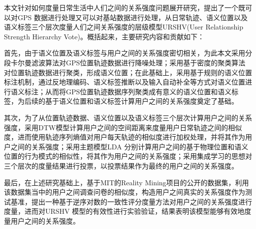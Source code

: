 \begin{cabstract}
本文针对如何度量日常生活中人们之间的关系强度问题展开研究，提出了一个既可以对GPS 数据进行处理又可以对基站数据进行处理，从日常轨迹、语义位置以及语义标签三个层次度量人们之间关系强度的层级模型URSHV(User Relationship Strength Hierarchy Vote)。概括起来，主要研究内容和贡献如下：
\par 首先，由于语义位置及语义标签与用户之间的关系强度密切相关，为此本文采用分段卡尔曼滤波算法对GPS位置轨迹数据进行降噪处理；采用基于密度的聚类算法对位置轨迹数据进行聚类，形成语义位置；在此基础上，采用基于规则的语义位置标注机制，通过反地理编码、语义标签推断以及输入自动补全等方式对语义位置进行语义标注；从而将GPS位置轨迹数据序列聚类成有意义的语义位置和语义标签，为后续的基于语义位置和语义标签计算用户之间的关系强度奠定了基础。
\par 其次，为了从位置轨迹数据、语义位置以及语义标签三个层次计算用户之间的关系强度，采用DTW模型计算用户之间的空间距离来度量用户日常轨迹之间的相似度，进而使用轨迹序列熵值对用户每天轨迹的相似度进行加权处理，并将其作为用户之间的关系强度；采用主题模型LDA 分别计算用户之间的基于物理位置和语义位置的行为模式的相似性，将其作为用户之间的关系强度；采用集成学习的思想对三个层次的度量结果进行投票，以投票结果作为最终的用户之间的关系强度。
\par 最后，在上述研究基础上，基于MIT的Reality Mining项目的公开的数据集，利用该数据集当中的用户之间调查问卷的相似度，构造用户之间真实的关系强度作为测试基准，提出一种基于逆序对数的一致性评分度量方法对用户之间的关系强度进行度量，进而对URSHV 模型的有效性进行实验验证，结果表明该模型能够有效地度量用户之间的关系强度。
\end{cabstract}

